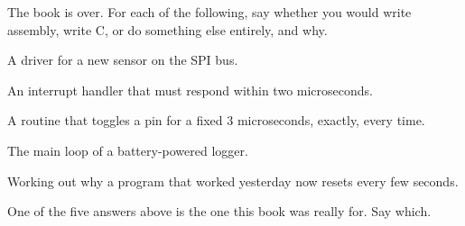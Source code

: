 \label{c6:ex:reach}
The book is over. For each of the following, say whether you would write assembly, write C, or do
something else entirely, and why.
\begin{parts}
  \item A driver for a new sensor on the SPI bus.
  \item An interrupt handler that must respond within two microseconds.
  \item A routine that toggles a pin for a fixed 3 microseconds, exactly, every time.
  \item The main loop of a battery-powered logger.
  \item Working out why a program that worked yesterday now resets every few seconds.
  \item One of the five answers above is the one this book was really for. Say which.
\end{parts}
